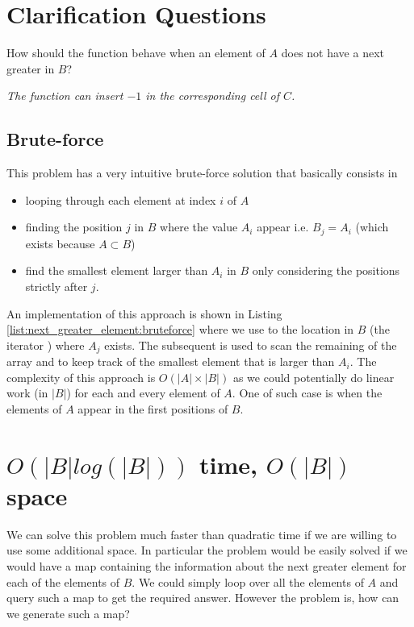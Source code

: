 \section{Clarification Questions}

\begin{QandA}
	\item How should the function behave when an element of $A$ does not have a next greater in $B$?
	\begin{answered}
		\textit{The function can insert $-1$ in the corresponding cell of $C$.}
	\end{answered}
	
\end{QandA}

\subsection{Brute-force}
\label{next_greater_element:sec:bruteforce}
This problem has a very intuitive brute-force solution that basically consists in 
\begin{itemize}
	\item looping through each element at index $i$ of $A$
	\item finding the position $j$ in $B$ where the value $A_i$ appear i.e. $B_j = A_i$ (which
	exists because $A \subset B$)
	\item find the smallest element larger than $A_i$ in $B$ only considering the positions strictly
	after $j$.
\end{itemize}
An implementation of this approach is shown in Listing \ref{list:next_greater_element:bruteforce} where we use
 to the location in $B$ (the iterator ) where $A_j$ exists. The
subsequent  is used to scan the remaining of the array and to keep track of the
smallest element that is larger than $A_i$. The complexity of this approach is $O(|A| \times |B|)$
as we could potentially do linear  work (in $|B|$) for each and every element of $A$. One of such
case is when the elements of $A$ appear in the first positions of $B$. 



\section{$O(|B|log(|B|))$ time, $O(|B|)$ space}
\label{next_greater_element:sec:nlogntime}
We can solve this problem much faster than quadratic time if we are willing to use some additional
space. In particular the problem would be easily solved if we would have a map containing the
information about the next greater element for each of the elements of $B$. We could simply loop
over all the elements of $A$ and query such a map to get the required answer. However the problem is,
how can we generate such a map?

